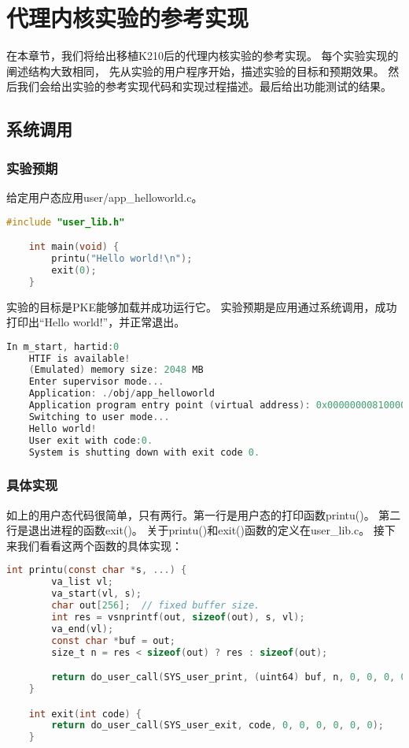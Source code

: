 \chapter{代理内核实验的参考实现}

在本章节，我们将给出移植K210后的代理内核实验的参考实现。
每个实验实现的阐述结构大致相同，
先从实验的用户程序开始，描述实验的目标和预期效果。
然后我们会给出实验的参考实现代码和实现过程描述。最后给出功能测试的结果。

\section{系统调用}

\subsection{实验预期}

给定用户态应用user/app\_helloworld.c。

\begin{lstlisting}[caption={用户态应用app\_helloworld.c}, label={lst:app_helloworld}, language=C]
    #include "user_lib.h"

    int main(void) {
        printu("Hello world!\n");
        exit(0);
    }   
\end{lstlisting}

实验的目标是PKE能够加载并成功运行它。
实验预期是应用通过系统调用，成功打印出“Hello world!”，并正常退出。

\begin{lstlisting}[caption={lab1实验结果（移植K210前）}, label={lst:syscall_before}, language=C]
    In m_start, hartid:0
    HTIF is available!
    (Emulated) memory size: 2048 MB
    Enter supervisor mode...
    Application: ./obj/app_helloworld
    Application program entry point (virtual address): 0x0000000081000000
    Switching to user mode...
    Hello world!
    User exit with code:0.
    System is shutting down with exit code 0.    
\end{lstlisting}

\subsection{具体实现}

如上的用户态代码很简单，只有两行。第一行是用户态的打印函数printu()。
第二行是退出进程的函数exit()。
关于printu()和exit()函数的定义在user\_lib.c。
接下来我们看看这两个函数的具体实现：

\begin{lstlisting}[caption={printu与exit的实现}, label={lst:printu_exit}, language=C]
    int printu(const char *s, ...) {
        va_list vl;
        va_start(vl, s);
        char out[256];  // fixed buffer size.
        int res = vsnprintf(out, sizeof(out), s, vl);
        va_end(vl);
        const char *buf = out;
        size_t n = res < sizeof(out) ? res : sizeof(out);

        return do_user_call(SYS_user_print, (uint64) buf, n, 0, 0, 0, 0, 0);
    }

    int exit(int code) {
        return do_user_call(SYS_user_exit, code, 0, 0, 0, 0, 0, 0);
    }   
\end{lstlisting}


